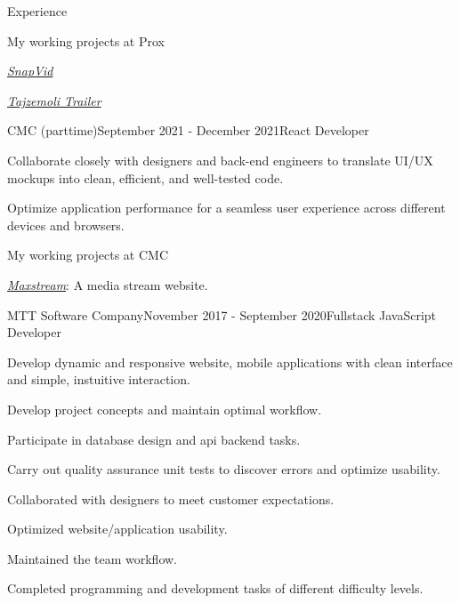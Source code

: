\documentclass{resume}
\begin{document}
\begin{rSection}{Experience}
    \vspace{-0.5cm}\begin{rSubsection}{}{}{My working projects at Prox}{}
      \item \href{https://apps.apple.com/us/app/pure-tubi-mp3-player/id1658133343}{\emph{SnapVid}}
      \item \href{https://apps.apple.com/vn/app/id1617873009}{\emph{Tajzemoli Trailer}}
    \end{rSubsection}

    \vspace{0.8cm}\begin{rSubsection}{CMC (parttime)}{September 2021 - December 2021}{React Developer}{}
      \item Collaborate closely with designers and back-end engineers to translate UI/UX mockups into clean, efficient, and well-tested code.
      \item Optimize application performance for a seamless user experience across different devices and browsers.
    \end{rSubsection}

    \vspace{-0.5cm}\begin{rSubsection}{}{}{My working projects at CMC}{}
      \item \href{https://maxstream.tv/}{\emph{Maxstream}}: A media stream website.
    \end{rSubsection}


    \vspace{0.8cm}\begin{rSubsection}{MTT Software Company}{November 2017 - September 2020}{Fullstack JavaScript Developer}{}
      \item Develop dynamic and responsive website, mobile applications with clean interface and simple, instuitive interaction.
      \item Develop project concepts and maintain optimal workflow.
      \item Participate in database design and api backend tasks.
      \item Carry out quality assurance unit tests to discover errors and optimize usability.
      \item Collaborated with designers to meet customer expectations.
      \item Optimized website/application usability.
      \item Maintained the team workflow.
      \item Completed programming and development tasks of different difficulty levels.
    \end{rSubsection}


\end{rSection}
\end{document}

